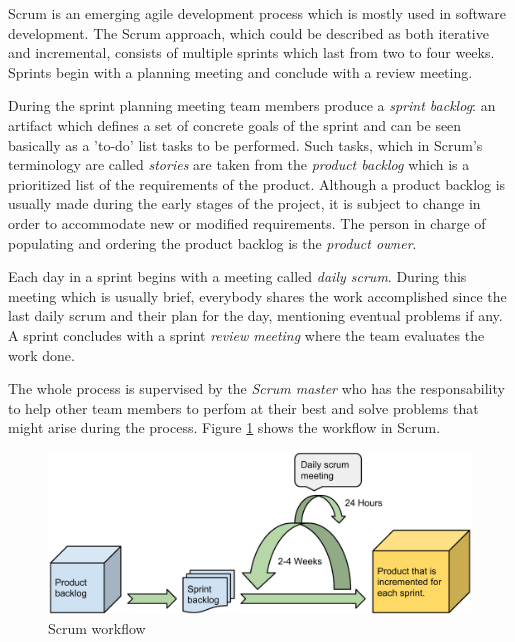 Scrum is an emerging agile development process which is mostly used in software development.
The Scrum approach, which could be described as both iterative and incremental, consists of multiple
sprints which last from two to four weeks. Sprints begin with a planning meeting and conclude with a review meeting.

During the sprint planning meeting team members produce a \emph{sprint backlog}: an artifact which defines a
set of concrete goals of the sprint and can be seen basically as a 'to-do' list tasks to be performed.
Such tasks, which in Scrum's terminology are called \emph{stories} are taken from the \emph{product backlog} which
is a prioritized list of the requirements of the product. Although a product backlog is usually made during the early
stages of the project, it is subject to change in order to accommodate new or modified requirements. 
The person in charge of populating and ordering the product backlog is the \emph{product owner}.

Each day in a sprint begins with a meeting called \emph{daily scrum}. 
During this meeting which is usually brief, everybody shares the work accomplished since the last daily
scrum and their plan for the day, mentioning eventual problems if any. 
A sprint concludes with a sprint \textit{review meeting} where the team evaluates the work done.

The whole process is supervised by the \textit{Scrum master} who has the responsability to
help other team members to perfom at their best and solve problems that might arise during the process.
Figure \ref{figure:scrum-workflow} shows the workflow in Scrum. \cite{Compendium}

\begin{figure}[h]
\begin{center}
\includegraphics[scale=0.5]{../Figures/Scrum-workflow.pdf}
\end{center}
\caption{Scrum workflow}
\label{figure:scrum-workflow}
\end{figure}

